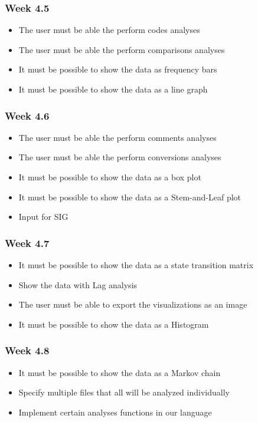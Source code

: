 \subsubsection{Week 4.5}
\begin{itemize}
	\item The user must be able the perform codes analyses
	\item The user must be able the perform comparisons analyses
	\item It must be possible to show the data as frequency bars
	\item It must be possible to show the data as a line graph
\end{itemize}
\subsubsection{Week 4.6}
\begin{itemize}
	\item The user must be able the perform comments analyses
	\item The user must be able the perform conversions analyses
	\item It must be possible to show the data as a box plot
	\item It must be possible to show the data as a Stem-and-Leaf plot
	\item Input for SIG
\end{itemize}
\subsubsection{Week 4.7}
\begin{itemize}
	\item It must be possible to show the data as a state transition matrix
	\item Show the data with Lag analysis
	\item The user must be able to export the visualizations as an image
	\item It must be possible to show the data as a Histogram
\end{itemize}
\subsubsection{Week 4.8}
\begin{itemize}
	\item It must be possible to show the data as a Markov chain
	\item Specify multiple files that all will be analyzed individually
	\item Implement certain analyses functions in our language
\end{itemize}
